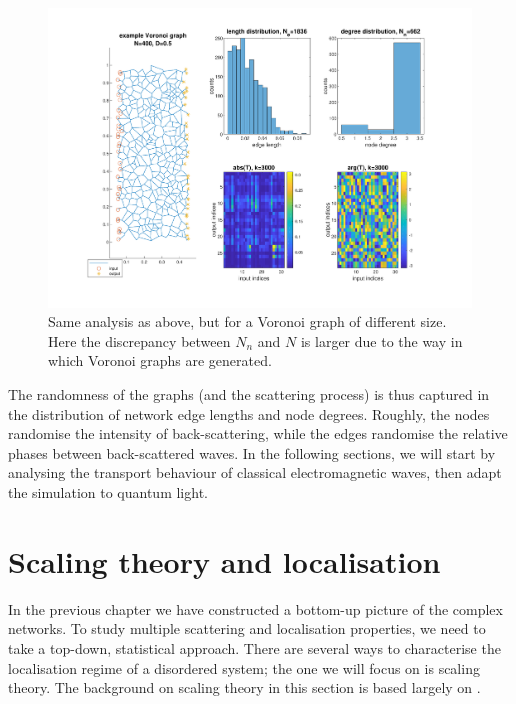\begin{figure}[h]
  \centering
    \includegraphics[width=\textwidth]{ch3/fig3/example_v.pdf}
    \caption{Same analysis as above, but for a Voronoi graph of different size. Here the discrepancy between $N_n$ and $N$ is larger due to the way in which Voronoi graphs are generated.} 
    \label{fig:example_voronoi}
\end{figure}

The randomness of the graphs (and the scattering process) is thus captured in the distribution of network edge lengths and node degrees. Roughly, the nodes randomise the intensity of back-scattering, while the edges randomise the relative phases between back-scattered waves. 
In the following sections, we will start by analysing the transport behaviour of classical electromagnetic waves, then adapt the simulation to quantum light.

\section{Scaling theory and localisation}
In the previous chapter we have constructed a bottom-up picture of the complex networks. To study multiple scattering and localisation properties, we need to take a top-down, statistical approach. There are several ways to characterise the localisation regime of a disordered system; the one we will focus on is scaling theory. The background on scaling theory in this section is based largely on \cite{Muller2011}. %


